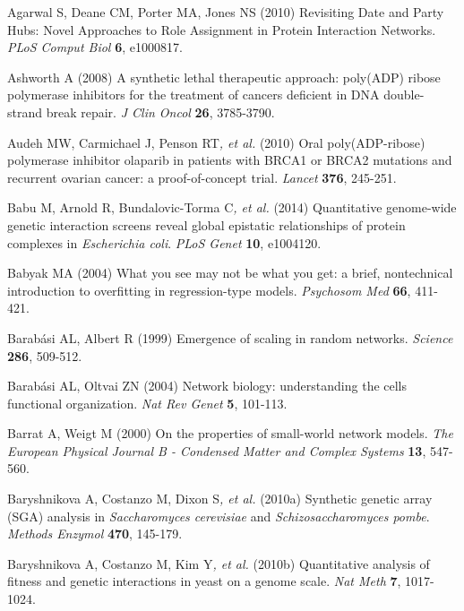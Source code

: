 \hypertarget{ENREF2}{}Agarwal S, Deane CM, Porter MA, Jones NS (2010)
Revisiting Date and Party Hubs: Novel Approaches to Role Assignment in
Protein Interaction Networks. \textit{PLoS Comput Biol} \textbf{6},
e1000817.



Ashworth A (2008) A synthetic lethal therapeutic approach: poly(ADP)
ribose polymerase inhibitors for the treatment of cancers deficient in
DNA double-strand break repair. \textit{J Clin Oncol} \textbf{26},
3785-3790.



Audeh MW, Carmichael J, Penson RT\textit{, et al.} (2010) Oral
poly(ADP-ribose) polymerase inhibitor olaparib in patients with BRCA1
or BRCA2 mutations and recurrent ovarian cancer: a proof-of-concept
trial. \textit{Lancet} \textbf{376}, 245-251.



Babu M, Arnold R, Bundalovic-Torma C\textit{, et al.} (2014)
Quantitative genome-wide genetic interaction screens reveal global
epistatic relationships of protein complexes in\textit{ Escherichia
coli}. \textit{PLoS Genet} \textbf{10}, e1004120.



\hypertarget{ENREF6}{}Babyak MA (2004) What you see may not be what you
get: a brief, nontechnical introduction to overfitting in
regression-type models. \textit{Psychosom Med} \textbf{66}, 411-421.



\hypertarget{ENREF7}{}Barab\'asi AL, Albert R (1999) Emergence of
scaling in random networks. \textit{Science} \textbf{286}, 509-512.



Barab\'asi AL, Oltvai ZN (2004) Network biology: understanding the
cell{\textquotesingle}s functional organization. \textit{Nat Rev Genet}
\textbf{5}, 101-113.



Barrat A, Weigt M (2000) On the properties of small-world network
models. \textit{The European Physical Journal B - Condensed Matter and
Complex Systems} \textbf{13}, 547-560.



Baryshnikova A, Costanzo M, Dixon S\textit{, et al.} (2010a) Synthetic
genetic array (SGA) analysis in \textit{Saccharomyces cerevisiae} and
\textit{Schizosaccharomyces pombe}. \textit{Methods Enzymol}
\textbf{470}, 145-179.



Baryshnikova A, Costanzo M, Kim Y\textit{, et al.} (2010b) Quantitative
analysis of fitness and genetic interactions in yeast on a genome
scale. \textit{Nat Meth} \textbf{7}, 1017-1024.



